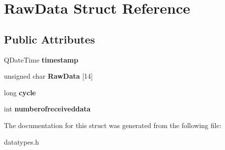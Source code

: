 \hypertarget{struct_raw_data}{}\section{Raw\+Data Struct Reference}
\label{struct_raw_data}
\subsection*{Public Attributes}
\begin{DoxyCompactItemize}
\item 
\hypertarget{struct_raw_data_a427ce6431c739dfcdaa7d9036e327072}{}Q\+Date\+Time {\bfseries timestamp}\label{struct_raw_data_a427ce6431c739dfcdaa7d9036e327072}

\item 
\hypertarget{struct_raw_data_a77b36f8ecceafd635f6d7751210df7d1}{}unsigned char {\bfseries Raw\+Data} \mbox{[}14\mbox{]}\label{struct_raw_data_a77b36f8ecceafd635f6d7751210df7d1}

\item 
\hypertarget{struct_raw_data_ad9f56398a9e1317181663582534b0d85}{}long {\bfseries cycle}\label{struct_raw_data_ad9f56398a9e1317181663582534b0d85}

\item 
\hypertarget{struct_raw_data_ae4be078eeb0818821f793ec7ab28232a}{}int {\bfseries numberofreceiveddata}\label{struct_raw_data_ae4be078eeb0818821f793ec7ab28232a}

\end{DoxyCompactItemize}


The documentation for this struct was generated from the following file\+:\begin{DoxyCompactItemize}
\item 
datatypes.\+h\end{DoxyCompactItemize}
